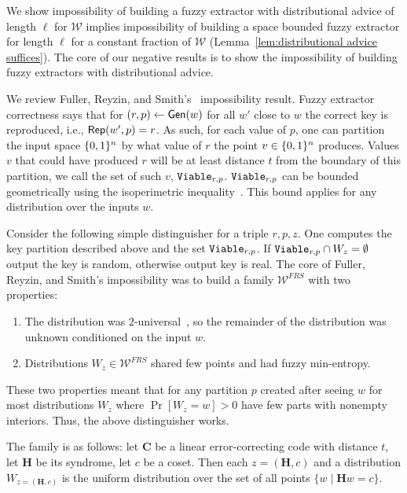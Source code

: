 We show impossibility of building a fuzzy extractor with distributional advice of length $\ell$ for $\mathcal{W}$ implies impossibility of building a space bounded fuzzy extractor for length $\ell$ for a constant fraction of $\mathcal{W}$ (Lemma~\ref{lem:distributional advice suffices}). 
The core of our negative results is to show the impossibility of building fuzzy extractors with distributional advice.   

We review Fuller, Reyzin, and Smith's~\cite{fuller2020fuzzy} impossibility result.
Fuzzy extractor correctness says that for $(r, p)\leftarrow {\ensuremath{\mathsf{Gen}}}(w)$ for all $w'$ close to $w$ the correct key is reproduced, i.e., ${\mathsf{Rep}}(w', p)=r$.  As such, for each value of $p$, one can partition the input space $\{0, 1\}^n$ by what value of $r$ the point  $v\in \{0, 1\}^n$ produces.  Values $v$ that could have produced  $r$ will be at least distance $t$ from the boundary of this partition, we call the set of such $v$, $\mathtt{Viable}_{r,p}$.  $\mathtt{Viable}_{r,p}$ can be bounded geometrically using the isoperimetric inequality~\cite{harper1966optimal}.  This bound applies for any distribution over the inputs $w$.

Consider the following simple distinguisher for a triple $r, p, z$.  One computes the key partition described above and the set $\mathtt{Viable}_{r,p}$. If $\mathtt{Viable}_{r,p} \cap W_z  = \emptyset$ output the key is random, otherwise output key is real. 
The core of Fuller, Reyzin, and Smith's impossibility was to build a family $\mathcal{W}^{FRS}$ with two properties:
\begin{enumerate}
\item The distribution was $2$-universal~\cite{carter1977universal}, so the remainder of the distribution was unknown conditioned on the input $w$. 
\item Distributions $W_z \in \mathcal{W}^{FRS}$ shared few points and had fuzzy min-entropy.
\end{enumerate}
These two properties meant that for any partition $p$ created after seeing $w$ for most distributions $W_z$ where $\Pr[W_z=w]>0$ have few parts with nonempty interiors. Thus, the above distinguisher works.

The family is as follows: let $\mathbf{C}$ be a linear error-correcting code with distance $t$, let $\mathbf{H}$ be its syndrome, let $c$ be a coset.  Then each $z = (\mathbf{H}, c)$ and a distribution $W_{z=(\mathbf{H}, c)}$ is the uniform distribution over  the set of all points $\{w \mid \mathbf{H} w = c\}$.

